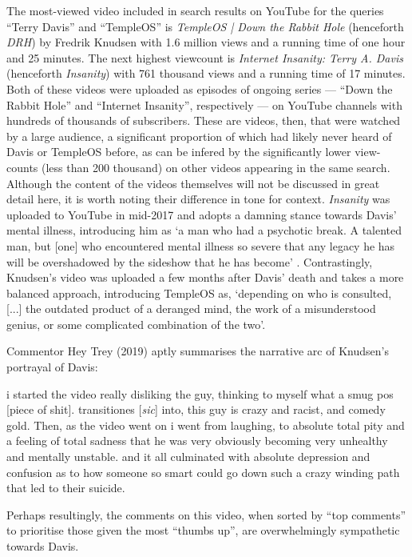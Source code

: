 \documentclass[Draft.tex]{subfiles}
\begin{document}
The most-viewed video included in search results on YouTube
for the queries ``Terry Davis'' and ``TempleOS'' is
\textit{TempleOS | Down the Rabbit Hole} (henceforth \textit{DRH})
by Fredrik Knudsen with 1.6 million views
and a running time of one hour and 25 minutes.
The next highest viewcount is \textit{Internet Insanity: Terry A. Davis}
(henceforth \textit{Insanity}) with 761 thousand views and a running time of 17 minutes.
Both of these videos were uploaded as episodes of ongoing series
--- ``Down the Rabbit Hole'' and ``Internet Insanity'', respectively ---
on YouTube channels with hundreds of thousands of subscribers.
These are videos, then, that were watched by a large audience,
a significant proportion of which had likely never heard of Davis
or TempleOS before, as can be infered
by the significantly lower view-counts (less than 200 thousand)
on other videos appearing in the same search.
Although the content of the videos themselves
will not be discussed in great detail here,
it is worth noting their difference in tone for context.
\textit{Insanity} was uploaded to YouTube in mid-2017 and adopts a damning stance
towards Davis' mental illness, introducing him as
`a man who had a psychotic break.
A talented man, but [one] who encountered mental illness so severe
that any legacy he has will be overshadowed
by the sideshow that he has become' \parencite*{Metokur17}.
Contrastingly, Knudsen's \parencite*{Knudsen18} video
was uploaded a few months after Davis' death and
takes a more balanced approach, introducing TempleOS as,
`depending on who is consulted, [...] the outdated product of a deranged mind,
the work of a misunderstood genius, or some complicated combination of the two'.

Commentor Hey Trey (2019) aptly summarises
the narrative arc of Knudsen's portrayal of Davis:
\begin{displayquote}
	i started the video really disliking the guy,
	thinking to myself what a smug pos [piece of shit].
	transitiones [\textit{sic}] into, this guy is crazy and racist, and comedy gold.
	Then, as the video went on i went from laughing, to absolute total pity
	and a feeling of total sadness that he was very obviously
	becoming very unhealthy and mentally unstable.
	and it all culminated with absolute depression and confusion as to
	how someone so smart could go down such a crazy winding path
	that led to their suicide.
\end{displayquote}
Perhaps resultingly, the comments on this video, when sorted by ``top comments''
to prioritise those given the most ``thumbs up'',
are overwhelmingly sympathetic towards Davis.
\end{document}
